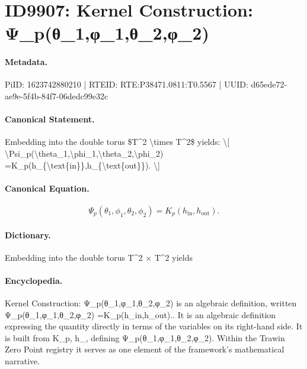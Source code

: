 \section*{ID9907: Kernel Construction: Ψ\_p(θ\_1,φ\_1,θ\_2,φ\_2)}
\paragraph{Metadata.}
PiID: 1623742880210 | RTEID: RTE:P38471.0811:T0.5567 | UUID: d65ede72-ae9e-5f4b-84f7-06dedc99e32c

\paragraph{Canonical Statement.}
Embedding into the double torus \$T\textasciicircum{}2 \textbackslash{}times T\textasciicircum{}2\$ yields: \textbackslash{}[ \textbackslash{}Psi\_p(\textbackslash{}theta\_1,\textbackslash{}phi\_1,\textbackslash{}theta\_2,\textbackslash{}phi\_2) =K\_p(h\_\{\textbackslash{}text\{in\}\},h\_\{\textbackslash{}text\{out\}\}). \textbackslash{}]

\paragraph{Canonical Equation.}
\[
\Psi_p(\theta_1,\phi_1,\theta_2,\phi_2) =K_p(h_{\text{in}},h_{\text{out}}).
\]

\paragraph{Dictionary.}
Embedding into the double torus T\textasciicircum{}2 × T\textasciicircum{}2 yields

\paragraph{Encyclopedia.}
Kernel Construction: Ψ\_p(θ\_1,φ\_1,θ\_2,φ\_2) is an algebraic definition, written Ψ\_p(θ\_1,φ\_1,θ\_2,φ\_2) =K\_p(h\_in,h\_out).. It is an algebraic definition expressing the quantity directly in terms of the variables on its right-hand side. It is built from K\_p, h\_, defining Ψ\_p(θ\_1,φ\_1,θ\_2,φ\_2). Within the Trawin Zero Point registry it serves as one element of the framework's mathematical narrative.
